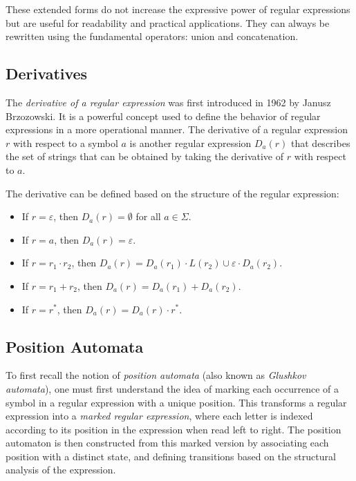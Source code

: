 These extended forms do not increase the expressive power of regular expressions but are useful for readability and practical applications. They can always be rewritten using the fundamental operators: union and concatenation.

\subsection{Derivatives}
The \emph{derivative of a regular expression} was first introduced in 1962 by Janusz Brzozowski. It is a powerful concept used to define the behavior of regular expressions in a more operational manner. The derivative of a regular expression $r$ with respect to a symbol $a$ is another regular expression $D_a(r)$ that describes the set of strings that can be obtained by taking the derivative of $r$ with respect to $a$.

The derivative can be defined based on the structure of the regular expression:

\begin{itemize}
    \item If $r = \varepsilon$, then $D_a(r) = \emptyset$ for all $a \in \Sigma$.
    \item If $r = a$, then $D_a(r) = \varepsilon$.
    \item If $r = r_1 \cdot r_2$, then $D_a(r) = D_a(r_1) \cdot L(r_2) \cup \varepsilon \cdot D_a(r_2)$.
    \item If $r = r_1 + r_2$, then $D_a(r) = D_a(r_1) + D_a(r_2)$.
    \item If $r = r^*$, then $D_a(r) = D_a(r) \cdot r^*$.
\end{itemize}

\subsection{Position Automata}

To first recall the notion of \emph{position automata} (also known as \emph{Glushkov automata}), one must first understand the idea of marking each occurrence of a symbol in a regular expression with a unique position. This transforms a regular expression into a \emph{marked regular expression}, where each letter is indexed according to its position in the expression when read left to right. The position automaton is then constructed from this marked version by associating each position with a distinct state, and defining transitions based on the structural analysis of the expression. \cite{mesh-of-automata}

